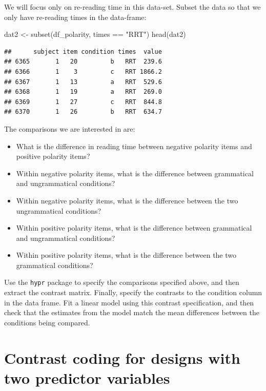 \documentclass[
  12pt,
]{krantz}
\newenvironment{Shaded}{\begin{snugshade}}{\end{snugshade}}
\newcommand{\FunctionTok}[1]{\textcolor[rgb]{0.00,0.00,0.00}{#1}}
\newcommand{\NormalTok}[1]{#1}
\newcommand{\OtherTok}[1]{\textcolor[rgb]{0.56,0.35,0.01}{#1}}
\newcommand{\SpecialCharTok}[1]{\textcolor[rgb]{0.00,0.00,0.00}{#1}}
\newcommand{\StringTok}[1]{\textcolor[rgb]{0.31,0.60,0.02}{#1}}
\providecommand{\tightlist}{%
  \setlength{\itemsep}{0pt}\setlength{\parskip}{0pt}}
\theoremstyle{definition}
\theoremstyle{definition}
\theoremstyle{definition}
\theoremstyle{definition}
\theoremstyle{remark}
\begin{document}
We will focus only on re-reading time in this data-set. Subset the data so that we only have re-reading times in the data-frame:

\begin{Shaded}
\begin{Highlighting}[]
\NormalTok{dat2 }\OtherTok{\textless{}{-}} \FunctionTok{subset}\NormalTok{(df\_polarity, times }\SpecialCharTok{==} \StringTok{"RRT"}\NormalTok{)}
\FunctionTok{head}\NormalTok{(dat2)}
\end{Highlighting}
\end{Shaded}

\begin{verbatim}
##      subject item condition times  value
## 6365       1   20         b   RRT  239.6
## 6366       1    3         c   RRT 1866.2
## 6367       1   13         a   RRT  529.6
## 6368       1   19         a   RRT  269.0
## 6369       1   27         c   RRT  844.8
## 6370       1   26         b   RRT  634.7
\end{verbatim}

The comparisons we are interested in are:

\begin{itemize}
\tightlist
\item
  What is the difference in reading time between negative polarity items and positive polarity items?
\item
  Within negative polarity items, what is the difference between grammatical and ungrammatical conditions?
\item
  Within negative polarity items, what is the difference between the two ungrammatical conditions?
\item
  Within positive polarity items, what is the difference between grammatical and ungrammatical conditions?
\item
  Within positive polarity items, what is the difference between the two grammatical conditions?
\end{itemize}

Use the \texttt{hypr} package to specify the comparisons specified above, and then extract the contrast matrix. Finally, specify the contrasts to the condition column in the data frame. Fit a linear model using this contrast specification, and then check that the estimates from the model match the mean differences between the conditions being compared.

\hypertarget{ch:coding2x2}{%
\chapter{Contrast coding for designs with two predictor variables}\label{ch:coding2x2}}
\end{document}
